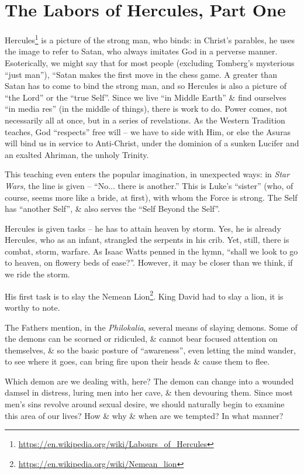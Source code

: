 \section{The Labors of Hercules, Part One}

Hercules\footnote{\url{https://en.wikipedia.org/wiki/Labours\_of\_Hercules}} is a picture of the strong man, who binds: in Christ's parables, he uses the image to refer to Satan, who always imitates God in a perverse manner. Esoterically, we might say that for most people (excluding Tomberg's mysterious ``just man''), ``Satan makes the first move in the chess game. A greater than Satan has to come to bind the strong man, and so Hercules is also a picture of ``the Lord'' or the ``true Self''. Since we live ``in Middle Earth'' \& find ourselves ``in media res'' (in the middle of things), there is work to do. Power comes, not necessarily all at once, but in a series of revelations. As the Western Tradition teaches, God ``respects'' free will -- we have to side with Him, or else the Asuras will bind us in service to Anti-Christ, under the dominion of a sunken Lucifer and an exalted Ahriman, the unholy Trinity.

This teaching even enters the popular imagination, in unexpected ways: in \emph{Star Wars}, the line is given -- ``No... there is another.'' This is Luke's ``sister'' (who, of course, seems more like a bride, at first), with whom the Force is strong. The Self has ``another Self'', \& also serves the ``Self Beyond the Self''.

Hercules is given tasks -- he has to attain heaven by storm. Yes, he is already Hercules, who as an infant, strangled the serpents in his crib. Yet, still, there is combat, storm, warfare. As Isaac Watts penned in the hymn, ``shall we look to go to heaven, on flowery beds of ease?''. However, it may be closer than we think, if we ride the storm.

His first task is to slay the Nemean Lion\footnote{\url{https://en.wikipedia.org/wiki/Nemean\_lion}}. King David had to slay a lion, it is worthy to note.

The Fathers mention, in the \emph{Philokalia}, several means of slaying demons. Some of the demons can be scorned or ridiculed, \& cannot bear focused attention on themselves, \& so the basic posture of ``awareness'', even letting the mind wander, to see where it goes, can bring fire upon their heads \& cause them to flee.

Which demon are we dealing with, here? The demon can change into a wounded damsel in distress, luring men into her cave, \& then devouring them. Since most men's sins revolve around sexual desire, we should naturally begin to examine this area of our lives? How \& why \& when are we tempted? In what manner?

